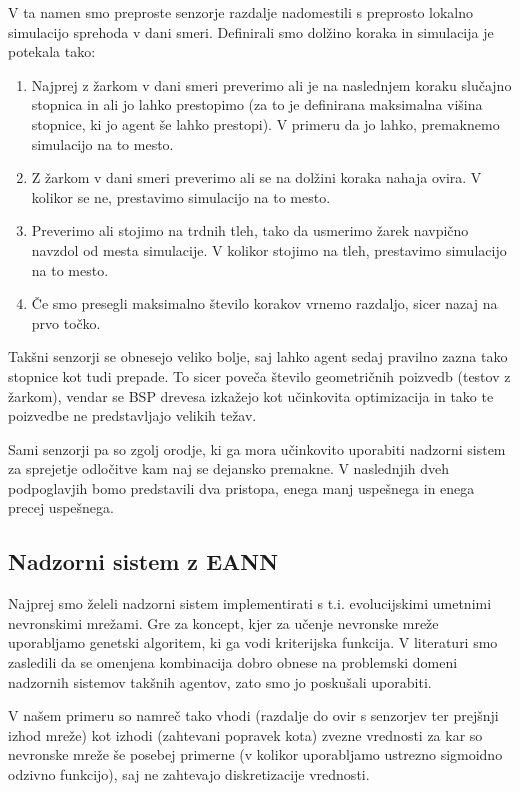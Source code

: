 \documentclass[a4paper,10pt]{article}
\begin{document}
V ta namen smo preproste senzorje razdalje nadomestili s preprosto lokalno simulacijo sprehoda v dani smeri. Definirali smo dolžino koraka in simulacija je potekala tako:
\begin{enumerate}
  \item Najprej z žarkom v dani smeri preverimo ali je na naslednjem koraku slučajno stopnica in ali jo lahko prestopimo (za to je definirana maksimalna višina stopnice, ki jo agent še lahko prestopi). V primeru da jo lahko, premaknemo simulacijo na to mesto.
  
  \item Z žarkom v dani smeri preverimo ali se na dolžini koraka nahaja ovira. V kolikor se ne, prestavimo simulacijo na to mesto.
  
  \item Preverimo ali stojimo na trdnih tleh, tako da usmerimo žarek navpično navzdol od mesta simulacije. V kolikor stojimo na tleh, prestavimo simulacijo na to mesto.
  
  \item Če smo presegli maksimalno število korakov vrnemo razdaljo, sicer nazaj na prvo točko.
\end{enumerate}

Takšni senzorji se obnesejo veliko bolje, saj lahko agent sedaj pravilno zazna tako stopnice kot tudi prepade. To sicer poveča število geometričnih poizvedb (testov z žarkom), vendar se BSP drevesa izkažejo kot učinkovita optimizacija in tako te poizvedbe ne predstavljajo velikih težav.

Sami senzorji pa so zgolj orodje, ki ga mora učinkovito uporabiti nadzorni sistem za sprejetje odločitve kam naj se dejansko premakne. V naslednjih dveh podpoglavjih bomo predstavili dva pristopa, enega manj uspešnega in enega precej uspešnega.

\subsection{Nadzorni sistem z EANN}

Najprej smo želeli nadzorni sistem implementirati s t.i. evolucijskimi umetnimi nevronskimi mrežami. Gre za koncept, kjer za učenje nevronske mreže uporabljamo genetski algoritem, ki ga vodi kriterijska funkcija. V literaturi \cite{champandard02} smo zasledili da se omenjena kombinacija dobro obnese na problemski domeni nadzornih sistemov takšnih agentov, zato smo jo poskušali uporabiti.

V našem primeru so namreč tako vhodi (razdalje do ovir s senzorjev ter prejšnji izhod mreže) kot izhodi (zahtevani popravek kota) zvezne vrednosti za kar so nevronske mreže še posebej primerne (v kolikor uporabljamo ustrezno sigmoidno odzivno funkcijo), saj ne zahtevajo diskretizacije vrednosti.
\end{document}
